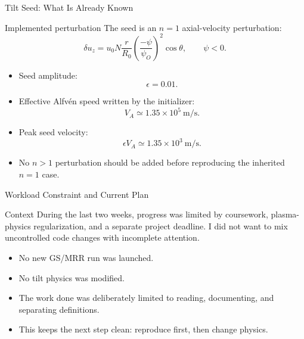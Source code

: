 \documentclass[10pt,aspectratio=169]{beamer}
\begin{document}
\begin{frame}{Tilt Seed: What Is Already Known}
    \begin{block}{Implemented perturbation}
        The seed is an \(n=1\) axial-velocity perturbation:
        \[
        \delta u_z
        =
        u_0
        N
        \frac{r}{R_0}
        \left(
        \frac{-\psi}{\psi_O}
        \right)^2
        \cos\theta,
        \qquad
        \psi<0.
        \]
    \end{block}

    \vspace{0.3cm}

    \begin{itemize}
        \item Seed amplitude:
        \[
        \epsilon=0.01.
        \]
        \item Effective Alfv\'en speed written by the initializer:
        \[
        V_A\simeq1.35\times10^5~\mathrm{m/s}.
        \]
        \item Peak seed velocity:
        \[
        \epsilon V_A\simeq1.35\times10^3~\mathrm{m/s}.
        \]
        \item No \(n>1\) perturbation should be added before reproducing the
        inherited \(n=1\) case.
    \end{itemize}
\end{frame}

\begin{frame}{Workload Constraint and Current Plan}
    \begin{block}{Context}
        During the last two weeks, progress was limited by coursework,
        plasma-physics regularization, and a separate project deadline. I did
        not want to mix uncontrolled code changes with incomplete attention.
    \end{block}

    \vspace{0.3cm}

    \begin{itemize}
        \item No new GS/MRR run was launched.
        \item No tilt physics was modified.
        \item The work done was deliberately limited to reading, documenting,
        and separating definitions.
        \item This keeps the next step clean: reproduce first, then change
        physics.
    \end{itemize}
\end{frame}
\end{document}

